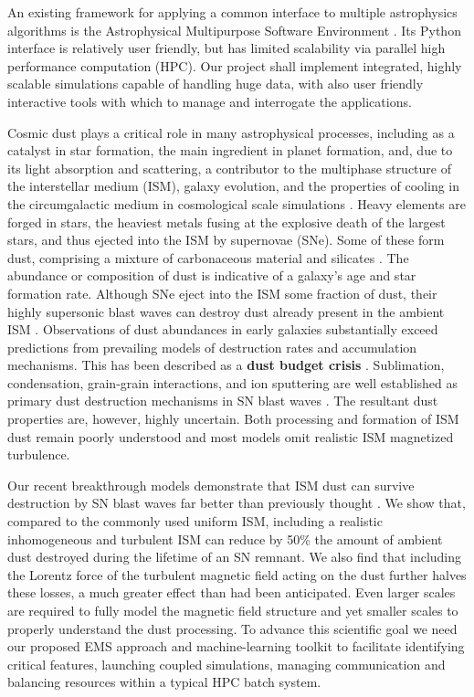 \documentclass[a4paper,12pt]{article}
\begin{document}
An existing framework for applying a common interface to multiple astrophysics
algorithms is the Astrophysical Multipurpose Software Environment
\citep{AMUSE}.  Its Python interface is relatively user friendly, but has
limited scalability via parallel high performance computation (HPC). Our
project shall implement integrated, highly scalable simulations capable of
handling huge data, with also user friendly interactive tools with which to
manage and interrogate the applications.

Cosmic dust plays a critical role in many astrophysical processes, including as
a catalyst in star formation, the main ingredient in planet formation, and, due
to its light absorption and scattering, a contributor to the multiphase
structure of the interstellar medium (ISM), galaxy evolution, and the
properties of cooling in the circumgalactic medium in cosmological scale
simulations \citep{Babul23}.  Heavy elements are forged in stars, the heaviest
metals fusing at the explosive death of the largest stars, and thus ejected
into the ISM by supernovae (SNe). Some of these form dust, comprising a mixture
of carbonaceous material and silicates \citep{Weingartner01}. The abundance or
composition of dust is indicative of a galaxy's age and star formation rate.
Although SNe eject into the ISM some fraction of dust, their highly supersonic
blast waves can destroy dust already present in the ambient ISM
\citep{McKee89}.  Observations of dust abundances in early galaxies
substantially exceed predictions from prevailing models of destruction rates
and accumulation mechanisms.  This has been described as a {\textbf{dust budget
crisis}} \citep{Rowlands14b}.  Sublimation, condensation, grain-grain
interactions, and ion sputtering are well established as primary dust
destruction mechanisms in SN blast waves \citep{Jones11}.  The resultant dust
properties are, however, highly uncertain.  Both processing and formation of
ISM dust remain poorly understood \citep{Draine09} and most models omit
realistic ISM magnetized turbulence.

Our recent breakthrough models demonstrate that ISM dust can survive
destruction by SN blast waves far better than previously thought \citep{KMG24}.
We show that, compared to the commonly used uniform ISM, including a realistic
inhomogeneous and turbulent ISM can reduce by 50\% the amount of ambient dust
destroyed during the lifetime of an SN remnant.  We also find that including
the Lorentz force of the turbulent magnetic field acting on the dust further
halves these losses, a much greater effect than had been anticipated.  Even
larger scales are required to fully model the magnetic field structure and yet
smaller scales to properly understand the dust processing. To advance this
scientific goal we need our proposed EMS approach and machine-learning toolkit
to facilitate identifying critical features, launching coupled simulations,
managing communication and balancing resources within a typical HPC batch
system.
\end{document}
